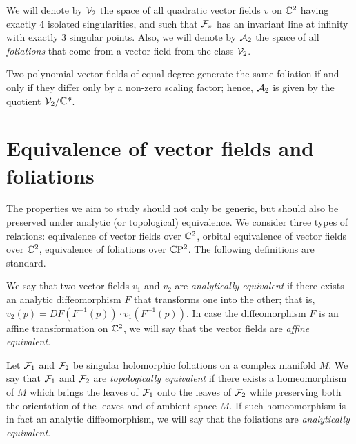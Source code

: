 \documentclass[phd,tocprelim]{cornell}
\begin{document}
\begin{definition}\label{def:classesV2A2}
 We will denote by $\mathcal{V}_2$ the space of all quadratic vector fields $v$ on $\mathbb{C}^2$ having exactly 4 isolated singularities, and such that $\mathcal{F}_v$ has an invariant line at infinity with exactly 3 singular points. Also, we will denote by $\mathcal{A}_2$ the space of all \textit{foliations} that come from a vector field from the class $\mathcal{V}_2$.
\end{definition}

\begin{remark}\label{rmk:scalingFactor}
 Two polynomial vector fields of equal degree generate the same foliation if and only if they differ only by a non-zero scaling factor; hence, $\mathcal{A}_2$ is given by the quotient $\mathcal{V}_2/\mathbb{C}\mbox{*}$.
\end{remark}




\section{Equivalence of vector fields and foliations}

The properties we aim to study should not only be generic, but should also be preserved under  analytic (or topological) equivalence. We consider three types of relations: equivalence of vector fields over $\mathbb{C}^2$, orbital equivalence of vector fields over $\mathbb{C}^2$, equivalence of foliations over $\mathbb{C}\mathrm{P}^2$. The following definitions are standard.

\begin{definition}\label{def:analyticEqVectorFields}
 We say that two vector fields $v_1$ and $v_2$ are \textit{analytically equivalent} if there exists an analytic diffeomorphism $F$ 
 that transforms one into the other; that is, $v_2(p)=DF(F^{-1}(p))\cdot v_1(F^{-1}(p))$. In case the diffeomorphism $F$ is an affine transformation on $\mathbb{C}^2$, we will say that the vector fields are \textit{affine equivalent}. 
\end{definition}

\begin{definition}\label{def:analyticEqFoliations}
 Let $\mathcal{F}_1$ and $\mathcal{F}_2$ be singular holomorphic foliations on a complex manifold $M$. We say that $\mathcal{F}_1$ and $\mathcal{F}_2$ are \textit{topologically equivalent} if there exists a homeomorphism  of $M$ which brings the leaves of $\mathcal{F}_1$ onto the leaves of $\mathcal{F}_2$ while preserving both the orientation of the leaves and of ambient space $M$. If such homeomorphism is in fact an analytic diffeomorphism, we will say that the foliations are \textit{analytically equivalent}.
\end{definition}
\end{document}
